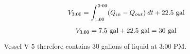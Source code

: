 $$V_{3:00} = \int_{1:00}^{3:00} (Q_{in} - Q_{out}) \> dt + 22.5 \hbox{ gal}$$

$$V_{3:00} = 7.5 \hbox{ gal} + 22.5 \hbox{ gal} = 30 \hbox{ gal}$$

Vessel V-5 therefore contains 30 gallons of liquid at 3:00 PM.











